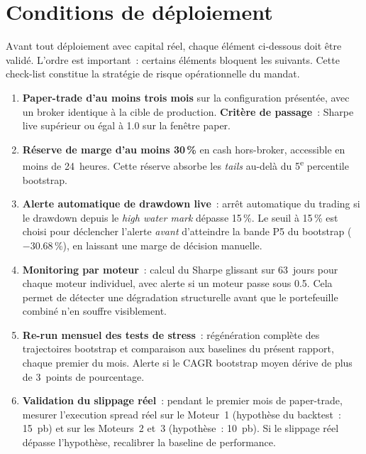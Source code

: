 \section{Conditions de déploiement}
\label{sec:production}

\lettrine[lines=2, findent=2pt, nindent=0pt]{A}{v}ant tout déploiement avec capital réel, chaque élément ci-dessous doit être validé. L'ordre est important~: certains éléments bloquent les suivants. Cette check-list constitue la stratégie de risque opérationnelle du mandat.

\begin{enumerate}[label=\color{primary}\textbf{\arabic*.}]
\item \textbf{Paper-trade d'au moins trois mois} sur la configuration présentée, avec un broker identique à la cible de production. \textbf{Critère de passage}~: Sharpe live supérieur ou égal à 1.0 sur la fenêtre paper.

\item \textbf{Réserve de marge d'au moins 30\,\%} en cash hors-broker, accessible en moins de 24~heures. Cette réserve absorbe les \emph{tails} au-delà du 5\textsuperscript{e} percentile bootstrap.

\item \textbf{Alerte automatique de drawdown live}~: arrêt automatique du trading si le drawdown depuis le \emph{high water mark} dépasse 15\,\%. Le seuil à 15\,\% est choisi pour déclencher l'alerte \emph{avant} d'atteindre la bande P5 du bootstrap ($-30.68\,\%$), en laissant une marge de décision manuelle.

\item \textbf{Monitoring par moteur}~: calcul du Sharpe glissant sur 63~jours pour chaque moteur individuel, avec alerte si un moteur passe sous 0.5. Cela permet de détecter une dégradation structurelle avant que le portefeuille combiné n'en souffre visiblement.

\item \textbf{Re-run mensuel des tests de stress}~: régénération complète des trajectoires bootstrap et comparaison aux baselines du présent rapport, chaque premier du mois. Alerte si le CAGR bootstrap moyen dérive de plus de 3~points de pourcentage.

\item \textbf{Validation du slippage réel}~: pendant le premier mois de paper-trade, mesurer l'execution spread réel sur le Moteur~1 (hypothèse du backtest~: 15~pb) et sur les Moteurs~2 et~3 (hypothèse~: 10~pb). Si le slippage réel dépasse l'hypothèse, recalibrer la baseline de performance.


\end{enumerate}
